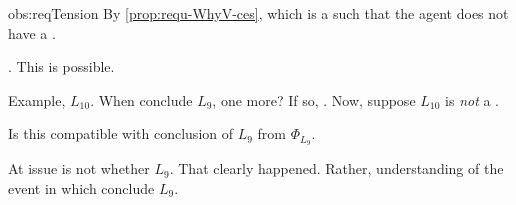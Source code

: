 \begin{note}
  \begin{motivation}{obs:reqTension}
    By \autoref{prop:requ-WhyV-ces}, \fc{} which is a \requ{} such that the agent does not have a \ros{}.

    \supportII{}.
    This is possible.
  \end{motivation}

  Example, \(L_{10}\).
  When conclude \(L_{9}\), one more?
  If so, \fc{}.
  Now, suppose \(L_{10}\) is \emph{not} a \fc{}.

  Is this compatible with conclusion of \(L_{9}\) from \(\Phi_{L_{9}}\).

  At issue is not whether \eval{} \(L_{9}\).
  That clearly happened.
  Rather, understanding of the event in which conclude \(L_{9}\).
\end{note}



